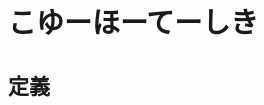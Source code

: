 \documentclass[dvipdfm]{beamer}
\begin{document}


\section{こゆーほーてーしき}

\subsection{定義}
\end{document}
